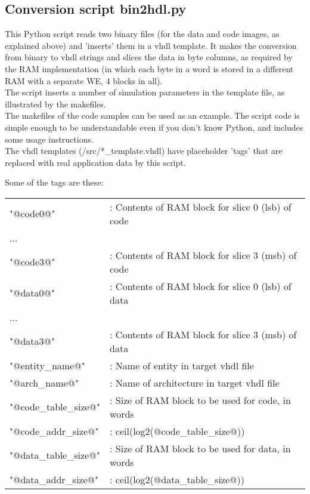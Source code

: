 \documentclass[11pt]{article}
\begin{document}
\subsection{Conversion script bin2hdl.py}
\label{python_script}

    This Python script reads two binary files (for the data and code images, as
    explained above) and 'inserts' them in a vhdl template. It makes the
    conversion from binary to vhdl strings and slices the data in byte columns,
    as required by the RAM implementation (in which each byte in a word is
    stored in a different RAM with a separate WE, 4 blocks in all).\\
    
    The script inserts a number of simulation parameters in the template file,
    as illustrated by the makefiles.\\
    
    The makefiles of the code samples can be used as an example. The script code
    is simple enough to be understandable even if you don't know Python, and
    includes some usage instructions.\\

    The vhdl templates (/src/*\_template.vhdl) have placeholder 'tags' that are
    replaced with real application data by this script.

    Some of the tags are these:

    \begin{tabular}{ l l }
    "@code0@"             & : Contents of RAM block for slice 0 (lsb) of code\\
       ...\\
    "@code3@"             & : Contents of RAM block for slice 3 (msb) of code\\
    "@data0@"             & : Contents of RAM block for slice 0 (lsb) of data\\
       ...\\
    "@data3@"             & : Contents of RAM block for slice 3 (msb) of data\\
    "@entity\_name@"       & : Name of entity in target vhdl file\\
    "@arch\_name@"         & : Name of architecture in target vhdl file\\
    "@code\_table\_size@"   & : Size of RAM block to be used for code, in words\\
    "@code\_addr\_size@"    & : ceil(log2(@code\_table\_size@))\\
    "@data\_table\_size@"   & : Size of RAM block to be used for data, in words\\
    "@data\_addr\_size@"    & : ceil(log2(@data\_table\_size@))\\
    \end{tabular}\\
\end{document}
